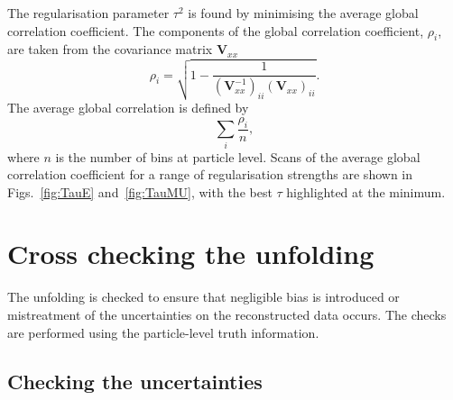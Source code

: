 The regularisation parameter $\tau^2$ is found by minimising the average global correlation coefficient. 
The components of the global correlation coefficient, $\rho_{i}$, are taken from the covariance matrix $\mathbf{V}_{xx}$
\begin{equation*}
\rho_{i} = \sqrt{1-\frac{1}{(\mathbf{V}_{xx}^{-1})_{ii}(\mathbf{V}_{xx})_{ii}}}.
\end{equation*}
The average global correlation is defined by 
\begin{equation*}
	\sum_{i}\frac{\rho_{i}}{n},
\end{equation*}
where $n$ is the number of bins at particle level. 
Scans of the average global correlation coefficient for a range of regularisation strengths are shown in Figs.~\ref{fig:TauE} and~\ref{fig:TauMU}, with the best $\tau$ highlighted at the minimum.


\section{Cross checking the unfolding} %
\label{sec:cross_checking_the_unfolding}

The unfolding is checked to ensure that negligible bias is introduced or mistreatment of the uncertainties on the reconstructed data occurs. 
The checks are performed using the particle-level truth information.

\subsection{Checking the uncertainties} %
\label{sub:checking_the_uncertainties}

